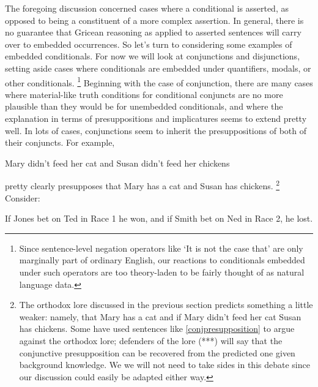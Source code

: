 \documentclass[If.tex]{subfiles}
\begin{document}
\begin{prop}
The foregoing discussion concerned cases where a conditional is asserted, as opposed to being a constituent of a more complex assertion.  In general, there is no guarantee that Gricean reasoning as applied to asserted sentences will carry over to embedded occurrences.  So let's turn to considering some examples of embedded conditionals.  For now we will look at conjunctions and disjunctions, setting aside cases where conditionals are embedded under quantifiers, modals, or other conditionals.%
\footnote{Since sentence-level negation operators like ‘It is not the case that’ are only marginally part of ordinary English, our reactions to conditionals embedded under such operators are too theory-laden to be fairly thought of as natural language data.}  
Beginning with the case of conjunction, there are many cases where material-like truth conditions for conditional conjuncts are no more plausible than they would be for unembedded conditionals, and where the explanation in terms of presuppositions and implicatures seems to extend pretty well.  In lots of cases, conjunctions seem to inherit the presuppositions of both of their conjuncts.  For example,
\begin{prop}
	\nitem \label{conjpresupposition}
	Mary didn't feed her cat and Susan didn't feed her chickens
\end{prop}
pretty clearly presupposes that Mary has a cat and Susan has chickens.%
\footnote{The orthodox lore discussed in the previous section predicts something a little weaker: namely, that Mary has a cat and if Mary didn't feed her cat Susan has chickens.  Some have used sentences like \ref{conjpresupposition} to argue against the orthodox lore; defenders of the lore (***) will say that the conjunctive presupposition can be recovered from the predicted one given background knowledge.  We we will not need to take sides in this debate since our discussion could easily be adapted either way.}
Consider:
\begin{prop}
	\nitem \label{boringand}
	If Jones bet on Ted in Race 1 he won, and if Smith bet on Ned in Race 2, he lost.
\end{prop}

\end{prop}
\end{document}
